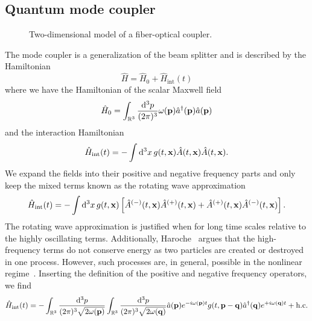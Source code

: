 \FloatBarrier
\subsection{Quantum mode coupler}

\begin{figure}[htb]
	\centering
	
	\caption{Two-dimensional model of a fiber-optical coupler.}\label{fig:fiber_coupler}
\end{figure}

The mode coupler is a generalization of the beam splitter and is described by the Hamiltonian
\begin{equation}
	\hat{H}
	=
	\hat{H}_0
	+
	\hat{H}_\text{int}(t)
\end{equation}
where we have the Hamiltonian of the scalar Maxwell field
\begin{equation}
	\hat{H}_0
	=
	\int_{\mathbb{R}^3}\frac{\dd[3]{p}}{(2\pi)^3}
	\omega(\vb{p})
	\hat{a}^\dagger(\vb{p})
	\hat{a}(\vb{p})
\end{equation}
and the interaction Hamiltonian
\begin{equation}
	\hat{H}_\text{int}(t)
	=
	-
	\int\dd[3]{x}
	g(t,\vb{x})
	\hat{A}(t,\vb{x})
	\hat{A}(t,\vb{x})
	.
\end{equation}
We expand the fields into their positive and negative frequency parts and only keep the mixed terms known as the rotating wave approximation~\cite[p.~158]{Gardiner2000}
\begin{equation}
	\hat{H}_\text{int}(t)
	=
	-
	\int\dd[3]{x}
	g(t,\vb{x})
	\left[
		\hat{A}^{(-)}(t,\vb{x})
		\hat{A}^{(+)}(t,\vb{x})
		+
		\hat{A}^{(+)}(t,\vb{x})
		\hat{A}^{(-)}(t,\vb{x})
	\right]
	.
\end{equation}
The rotating wave approximation is justified when for long time scales relative to the highly oscillating terms.
Additionally, Haroche~\cite[p.~127]{Haroche2006} argues that the high-frequency terms do not conserve energy as two particles are created or destroyed in one process.
However, such processes are, in general, possible in the nonlinear regime~\cite{QuesadaMejia2015}.
Inserting the definition of the positive and negative frequency operators, we find
\begin{equation}
	\hat{H}_\text{int}(t)
	=
	-
	\int_{\mathbb{R}^3}
	\frac{\dd[3]{p}}{(2\pi)^3\sqrt{2\omega(\vb{p})}}
	\int_{\mathbb{R}^3}
	\frac{\dd[3]{p}}{(2\pi)^3\sqrt{2\omega(\vb{q})}}
	\hat{a}(\vb{p})
	e^{-i\omega(\vb{p})t}
	g(t,\vb{p}-\vb{q})
	\hat{a}^\dagger(\vb{q})
	e^{+i\omega(\vb{q})t}
	+
	\text{h.c.}
\end{equation}
